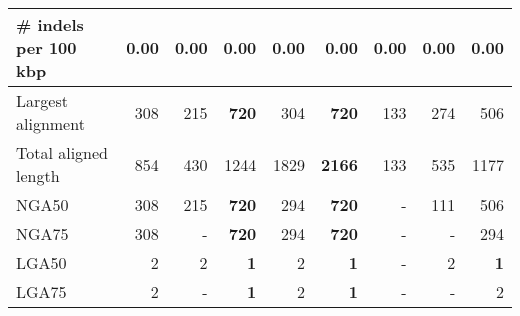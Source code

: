 \documentclass[12pt,a4paper]{article}
\begin{document}
\begin{table}[ht]
\begin{center}
\begin{tabular}{|l*{8}{|r}|}
\# indels per 100 kbp & 0.00 & 0.00 & 0.00 & 0.00 & 0.00 & 0.00 & 0.00 & 0.00 \\ \hline
Largest alignment & 308 & 215 & {\bf 720} & 304 & {\bf 720} & 133 & 274 & 506 \\ \hline
Total aligned length & 854 & 430 & 1244 & 1829 & {\bf 2166} & 133 & 535 & 1177 \\ \hline
NGA50 & 308 & 215 & {\bf 720} & 294 & {\bf 720} & - & 111 & 506 \\ \hline
NGA75 & 308 & - & {\bf 720} & 294 & {\bf 720} & - & - & 294 \\ \hline
LGA50 & 2 & 2 & {\bf 1} & 2 & {\bf 1} & - & 2 & {\bf 1} \\ \hline
LGA75 & 2 & - & {\bf 1} & 2 & {\bf 1} & - & - & 2 \\ \hline
\end{tabular}
\end{center}
\end{table}
\end{document}
